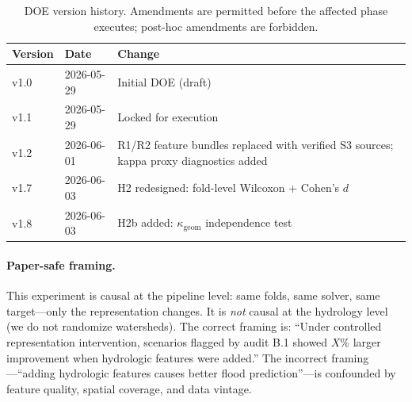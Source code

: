 \begin{table}[t]
\centering
\caption{DOE version history. Amendments are permitted before the affected
  phase executes; post-hoc amendments are forbidden.}
\label{app:tab:doe-versions}
\small
\begin{tabular}{@{}lll@{}}
\toprule
\textbf{Version} & \textbf{Date} & \textbf{Change} \\
\midrule
v1.0 & 2026-05-29 & Initial DOE (draft) \\
v1.1 & 2026-05-29 & Locked for execution \\
v1.2 & 2026-06-01 & R1/R2 feature bundles replaced with verified S3 sources;
                     kappa proxy diagnostics added \\
v1.7 & 2026-06-03 & H2 redesigned: fold-level Wilcoxon + Cohen's $d$ \\
v1.8 & 2026-06-03 & H2b added: $\kappa_\text{geom}$ independence test \\
\bottomrule
\end{tabular}
\end{table}

\paragraph{Paper-safe framing.}
This experiment is causal at the pipeline level: same folds, same solver,
same target---only the representation changes. It is \emph{not} causal at
the hydrology level (we do not randomize watersheds). The correct framing
is: ``Under controlled representation intervention, scenarios flagged by
audit B.1 showed $X$\% larger improvement when hydrologic features were
added.'' The incorrect framing---``adding hydrologic features causes better
flood prediction''---is confounded by feature quality, spatial coverage,
and data vintage.
